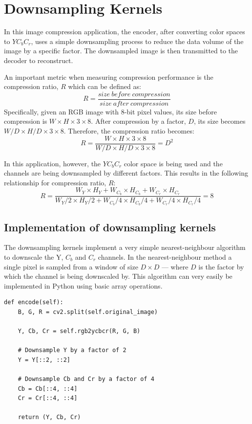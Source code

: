 \documentclass[10pt,twocolumn,letterpaper]{article}
\begin{document}
\section{Downsampling Kernels}
\label{sec:downsampling}

In this image compression application, the encoder, after converting color spaces to $YC_bC_r$, uses a simple downsampling process to reduce the data volume of the image by a specific factor. The downsampled image is then transmitted to the decoder to reconstruct. 

An important metric when measuring compression performance is the compression ratio, $R$ which can be defined as:
\[ R = \frac{size\ before\ compression}{size\ after\ compression} \] Specifically, given an RGB image with 8-bit pixel values, its size before compression is $W\times H\times 3\times 8$. After compression by a factor, $D$, its size becomes $W/D\times H/D\times 3\times 8$. Therefore, the compression ratio becomes:
\begin{equation}
    \label{eq:1}
   R = \frac{W\times H\times 3\times 8}{W/D\times H/D\times 3\times 8} = D^2
\end{equation}

In this application, however, the $YC_bC_r$ color space is being used and the channels are being downsampled by different factors. This results in the following relationship for compression ratio, $R$:
{\footnotesize
\begin{equation}
    \label{eq:2}
   R = \frac{W_Y\times H_Y + W_{C_b}\times H_{C_b} + W_{C_r}\times H_{C_r}}{W_Y/2\times H_Y/2 + W_{C_b}/4\times H_{C_b}/4 + W_{C_r}/4\times H_{C_r}/4} = 8
\end{equation}
}

\subsection{Implementation of downsampling kernels}
The downsampling kernels implement a very simple nearest-neighbour algorithm to downscale the Y, $C_b$ and $C_r$ channels. In the nearest-neighbour method a single pixel is sampled from a window of size $D\times D$ — where $D$ is the factor by which the channel is being downscaled by. This algorithm can very easily be implemented in Python using basic array operations. 
\newline
{\footnotesize
\begin{verbatim}
def encode(self):
    B, G, R = cv2.split(self.original_image)

    Y, Cb, Cr = self.rgb2ycbcr(R, G, B)

    # Downsample Y by a factor of 2
    Y = Y[::2, ::2]

    # Downsample Cb and Cr by a factor of 4
    Cb = Cb[::4, ::4]
    Cr = Cr[::4, ::4]

    return (Y, Cb, Cr)
\end{verbatim}
}
\end{document}
